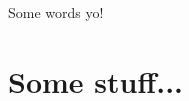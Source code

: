 \documentclass[12pt]{article}
\date{}
\author{Adrian Price-Whelan}
\begin{document}
\maketitle

Some words yo!

\section{Some stuff...}


% 
% 
\end{document}

